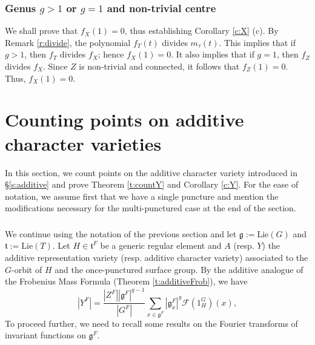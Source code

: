 \documentclass[12pt]{amsart}
\theoremstyle{plain}
\theoremstyle{definition}
\theoremstyle{remark}
\newcommand{\bY}{{Y}}
\newcommand{\fg}{\mathfrak{g}}
\newcommand{\ft}{\mathfrak{t}}
\begin{document}
\subsubsection{Genus $g>1$ or $g=1$ and non-trivial centre} We shall prove that $f_X(1)=0$, thus establishing Corollary \ref{c:X} (c). By Remark \ref{r:divide}, the polynomial $f_T(t)$ divides $m_\tau(t)$. This implies that if $g>1$, then $f_T$ divides $f_X$; hence $f_X(1)=0$. 
It also implies that if $g=1$, then $f_Z$ divides $f_X$. Since $Z$ is non-trivial and connected, it follows that $f_Z(1)=0$. Thus, $f_X(1)=0$.


















\section{Counting points on additive character varieties}\label{s:countingY} \label{s:countY} In this section, we count points on the additive character variety introduced in \S \ref{s:additive} and prove Theorem \ref{t:countY} and Corollary \ref{c:Y}.  
For the ease of notation, we  assume first that we have a single puncture and mention the modifications necessary for the multi-punctured case at the end of the section. 

\subsubsection{} 
We continue using the notation of the previous section and let $\fg:=\mathrm{Lie}({G})$ and $\ft:=\mathrm{Lie}(T)$.  Let $H\in \ft^F$ be a generic  regular element and $A$ (resp. $Y$) the additive representation variety (resp. additive character variety) associated to the $G$-orbit of $H$ and the once-punctured surface group. By the additive analogue of the Frobenius Mass Formula (Theorem \ref{t:additiveFrob}), we have 
\begin{equation}\label{eq:SumY}
|\bY^F|=  \frac{|Z^F||\fg^F|^{g-1}}{|G^F|} \sum_{x\in \fg^F} |\fg_{x}^F|^{g} \mathcal{F}(1_{H}^G)(x),
\end{equation}
To proceed further, we need to recall some results on the Fourier transforms of invariant functions on $\fg^F$. 
\end{document}
